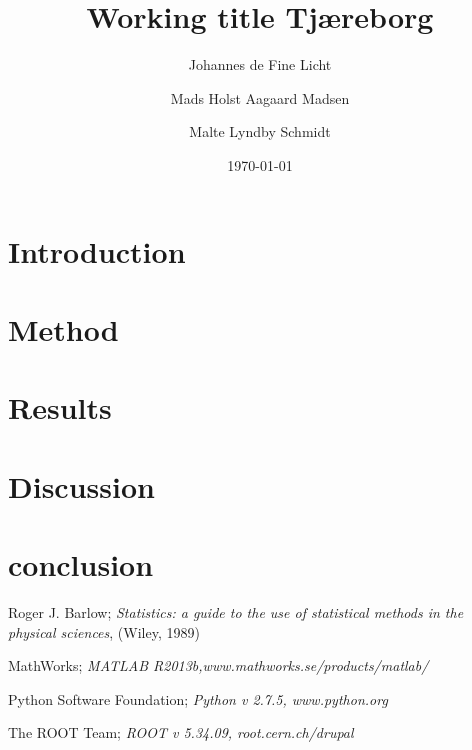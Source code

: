 \documentclass[a4paper,%
               reprint,%
               aps,%
               prl,%
               amsfonts,%
               amssymb,%
               amsmath,%
               twoside,%
               balancelastpage,%
               eqsecnum]%
               {revtex4-1}
\begin{document}

\title{Working title Tjæreborg}
\date{\today}                                                 %
\author{Johannes de Fine Licht}                                    %
\author{Mads Holst Aagaard Madsen}  
\author{Malte Lyndby Schmidt}       

\begin{abstract}                                              

\end{abstract}

\maketitle                                                    %

\section{Introduction}
\label{sec:introduction}


\section{Method}
\label{sec:method}


\section{Results}
\label{sec:results}


\section{Discussion}
\label{sec:discussion}


\section{conclusion}
\label{sec:conclusion}



\begin{thebibliography}{99}                                   

   Roger J. Barlow; \emph{Statistics: a guide to the use of
     statistical methods in the physical sciences}, (Wiley, 1989) 

   MathWorks; \emph{MATLAB R2013b,www.mathworks.se/products/matlab/} 
  
  Python Software Foundation; \emph{Python v 2.7.5, www.python.org} 

  The ROOT Team; \emph{ROOT v 5.34.09, root.cern.ch/drupal} 
  
\end{thebibliography}
\end{document}
